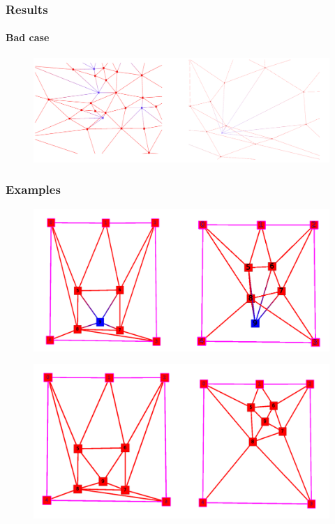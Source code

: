 \begin{frame}
\frametitle{Results}
\framesubtitle{Bad case}
\begin{exampleblock}{}
\begin{figure}[!h]
\centering
\includegraphics[scale=0.4]{../rapport/img/bad_case.png}
\end{figure}
\end{exampleblock}{}
\end{frame}

\begin{frame}
\frametitle{Examples}
\begin{exampleblock}{}
\begin{figure}[!h]
\centering
\includegraphics[scale=0.2]{../rapport/img/bad_exemple.png}
\end{figure}
\end{exampleblock}{}
\pause
\begin{exampleblock}{}
\begin{figure}[!h]
\centering
\includegraphics[scale=0.2]{../rapport/img/bad_good.png}
\end{figure}
\end{exampleblock}{}
\end{frame}
